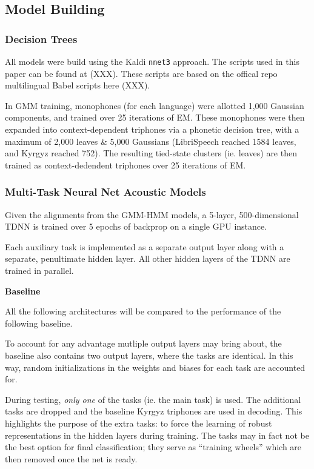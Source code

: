 \documentclass[a4paper]{article}
\begin{document}
\subsection{Model Building}

\subsubsection{Decision Trees}
All models were build using the Kaldi \texttt{nnet3} approach. The scripts used in this paper can be found at (XXX). These scripts are based on the offical repo multilingual Babel scripts here (XXX).

In GMM training, monophones (for each language) were allotted 1,000 Gaussian components, and trained over 25 iterations of EM. These monophones were then expanded into context-dependent triphones via a phonetic decision tree, with a maximum of 2,000 leaves \& 5,000 Gaussians (LibriSpeech reached 1584 leaves, and Kyrgyz reached 752). The resulting tied-state clusters (ie. leaves) are then trained as context-dedendent triphones over 25 iterations of EM.


\subsubsection{Multi-Task Neural Net Acoustic Models}

Given the alignments from the GMM-HMM models, a 5-layer, 500-dimensional TDNN is trained over 5 epochs of backprop on a single GPU instance.

Each auxiliary task is implemented as a separate output layer along with a separate, penultimate hidden layer. All other hidden layers of the TDNN are trained in parallel.



\textbf{Baseline}

All the following architectures will be compared to the performance of the following baseline.

To account for any advantage mutliple output layers may bring about, the baseline also contains two output layers, where the tasks are identical. In this way, random initializations in the weights and biases for each task are accounted for.

During testing, \textit{only one} of the tasks (ie. the main task) is used. The additional tasks are dropped and the baseline Kyrgyz triphones are used in decoding. This highlights the purpose of the extra tasks: to force the learning of robust representations in the hidden layers during training. The tasks may in fact not be the best option for final classification; they serve as ``training wheels'' which are then removed once the net is ready.
\end{document}
